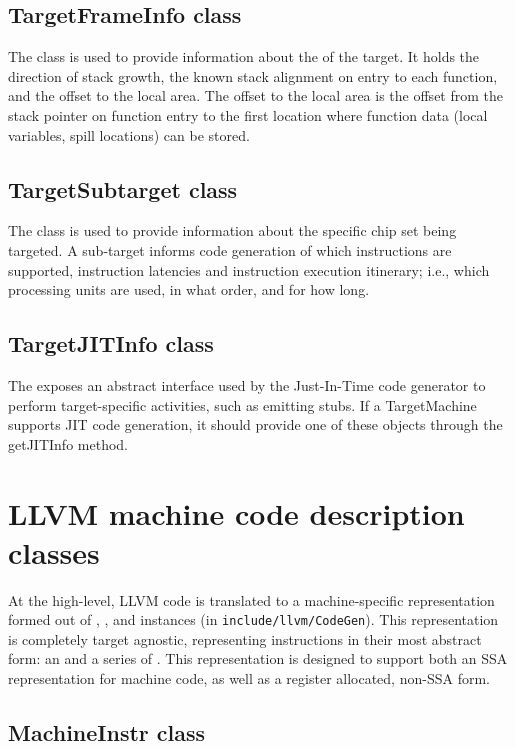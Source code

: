 \documentclass{myproc}
\begin{document}
\subsection{TargetFrameInfo class}
The  class is used to provide information about the
 of the target. It holds the direction of stack growth,
the known stack alignment on entry to each function, and the offset to the
local area. The offset to the local area is the offset from the stack pointer
on function entry to the first location where function data (local variables, 
spill locations) can be stored. 

\subsection{TargetSubtarget class}
The  class is used to provide information about the
specific chip set being targeted. A sub-target informs code generation of
which instructions are supported, instruction latencies and instruction
execution itinerary; i.e., which processing units are used, in what order, and
for how long. 


\subsection{TargetJITInfo class}
The  exposes an abstract interface used by the
Just-In-Time code generator to perform target-specific activities, such as
emitting stubs. If a TargetMachine supports JIT code generation, it should
provide one of these objects through the getJITInfo method.

\section{LLVM machine code description classes}
At the high-level, LLVM code is translated to a machine-specific
representation formed out of , , and 
 instances (in \verb+include/llvm/CodeGen+). This
representation 
is completely target agnostic, representing instructions in their most
abstract form: an  and a series of . This
representation is designed to support both an SSA representation for machine
code, as well as a register allocated, non-SSA form. 

\subsection{MachineInstr class}
\end{document}
